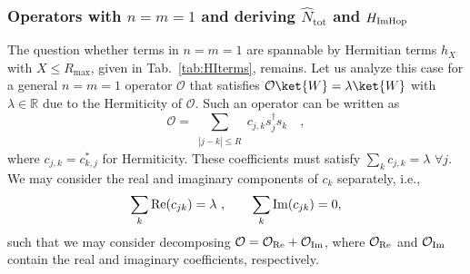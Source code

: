 \documentclass[prx,letterpaper,aps,superscriptaddress,floatfix,twocolumn,nofootinbib]{revtex4-2}
\theoremstyle{definition}
\newcommand{\tot}{\text{tot}}
\begin{document}
\subsubsection{Operators with $n = m = 1$ and deriving $\hat{N}_{\tot}$ and $H_{\rm ImHop}$}
%
The question whether terms in $n=m=1$ are spannable by Hermitian terms $h_X$ with $X\leq R_{\max}$, given in Tab.~\ref{tab:HIterms}, remains.
%
Let us analyze this case for a general $n=m=1$ operator $\mathcal{O}$ that satisfies $\mathcal{O}\ket{W}=\lambda\ket{W}$ with $\lambda\in \mathbb{R}$ due to the Hermiticity of $\mathcal{O}$. Such an operator can be written as
    $$\mathcal{O}=\sum_{\substack{|j-k|\leq R}} c_{j,k} s_j^\dag s_k
    \quad,$$
    where $c_{j,k}=c_{k,j}^*$ for Hermiticity.
    These coefficients must satisfy $\sum_k c_{j,k}=\lambda$ $\forall j$.
    We may consider the real and imaginary components of $c_k$ separately, i.e.,
    \begin{align}
        \sum_k {\rm Re}(c_{jk}) = \lambda ~, \qquad \sum_k {\rm Im}(c_{jk}) = 0,\nonumber
    \end{align}
    such that we may consider decomposing $\mathcal{O}=\mathcal{O}_{\rm Re}+\mathcal{O}_{\rm Im}$, where $\mathcal{O}_{\rm Re}$ and $\mathcal{O}_{\rm Im}$ contain the real and imaginary coefficients, respectively.
    
\end{document}
